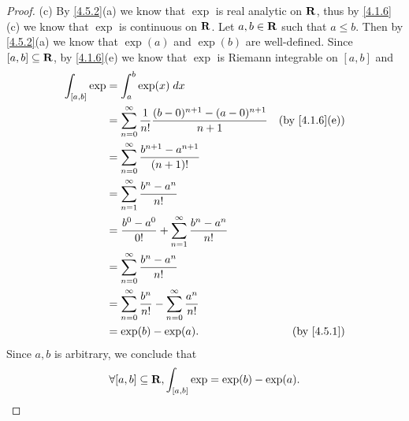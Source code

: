 \begin{proof}{(c)}
  By \cref{4.5.2}(a) we know that \(\exp\) is real analytic on \(\mathbf{R}\), thus by \cref{4.1.6}(c) we know that \(\exp\) is continuous on \(\mathbf{R}\).
  Let \(a, b \in \mathbf{R}\) such that \(a \leq b\).
  Then by \cref{4.5.2}(a) we know that \(\exp(a)\) and \(\exp(b)\) are well-defined.
  Since \([a, b] \subseteq \mathbf{R}\), by \cref{4.1.6}(e) we know that \(\exp\) is Riemann integrable on \([a, b]\) and
  \begin{align*}
    \int_{[a, b]} \exp & = \int_a^b \exp(x) \; dx                                                                                         \\
                       & = \sum_{n = 0}^\infty \frac{1}{n!} \frac{(b - 0)^{n + 1} - (a - 0)^{n + 1}}{n + 1} & \text{(by \cref{4.1.6}(e))} \\
                       & = \sum_{n = 0}^\infty \frac{b^{n + 1} - a^{n + 1}}{(n + 1)!}                                                     \\
                       & = \sum_{n = 1}^\infty \frac{b^n - a^n}{n!}                                                                       \\
                       & = \frac{b^0 - a^0}{0!} + \sum_{n = 1}^\infty \frac{b^n - a^n}{n!}                                                \\
                       & = \sum_{n = 0}^\infty \frac{b^n - a^n}{n!}                                                                       \\
                       & = \sum_{n = 0}^\infty \frac{b^n}{n!} - \sum_{n = 0}^\infty \frac{a^n}{n!}                                        \\
                       & = \exp(b) - \exp(a).                                                               & \text{(by \cref{4.5.1})}
  \end{align*}
  Since \(a, b\) is arbitrary, we conclude that
  \[
    \forall [a, b] \subseteq \mathbf{R}, \int_{[a, b]} \exp = \exp(b) - \exp(a).
  \]
\end{proof}

